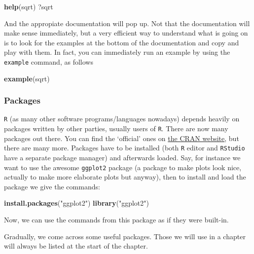 \documentclass[]{article}
\newenvironment{Shaded}{\begin{snugshade}}{\end{snugshade}}
\newcommand{\KeywordTok}[1]{\textcolor[rgb]{0.13,0.29,0.53}{\textbf{#1}}}
\newcommand{\StringTok}[1]{\textcolor[rgb]{0.31,0.60,0.02}{#1}}
\newcommand{\NormalTok}[1]{#1}
\theoremstyle{definition}
\theoremstyle{definition}
\theoremstyle{definition}
\theoremstyle{remark}
\begin{document}
\begin{Shaded}
\begin{Highlighting}[]
\KeywordTok{help}\NormalTok{(sqrt)}
\NormalTok{?sqrt}
\end{Highlighting}
\end{Shaded}

And the appropiate documentation will pop up. Not that the documentation
will make sense immediately, but a very efficient way to understand what
is going on is to look for the examples at the bottom of the
documentation and copy and play with them. In fact, you can immediately
run an example by using the \texttt{example} command, as follows

\begin{Shaded}
\begin{Highlighting}[]
\KeywordTok{example}\NormalTok{(sqrt)}
\end{Highlighting}
\end{Shaded}

\subsubsection{Packages}\label{subsec:packages}

\texttt{R} (as many other software programs/languages nowadays) depends
heavily on packages written by other parties, usually users of
\texttt{R}. There are now many packages out there. You can find the
`official' ones on
\href{https://cran.r-project.org/web/packages/available_packages_by_name.html}{the
CRAN website}, but there are many more. Packages have to be installed
(both \texttt{R} editor and \texttt{RStudio} have a separate package
manager) and afterwards loaded. Say, for instance we want to use the
awesome \texttt{ggplot2} package (a package to make plots look nice,
actually to make more elaborate plots but anyway), then to install and
load the package we give the commands:

\begin{Shaded}
\begin{Highlighting}[]
\KeywordTok{install.packages}\NormalTok{(}\StringTok{"ggplot2"}\NormalTok{)}
\KeywordTok{library}\NormalTok{(}\StringTok{"ggplot2"}\NormalTok{)}
\end{Highlighting}
\end{Shaded}

Now, we can use the commands from this package as if they were built-in.

Gradually, we come across some useful packages. Those we will use in a
chapter will always be listed at the start of the chapter.
\end{document}
